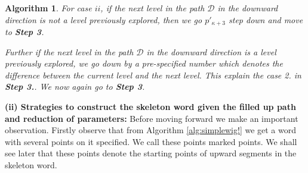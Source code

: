 \documentclass[12pt]{article}
\numberwithin{equation}{section}
\newtheorem{algorithm}{Algorithm}[section]
\numberwithin{equation}{section}
\theoremstyle{definition}
\renewcommand{\1}{\bf 1}
\begin{document}
\begin{algorithm}
\noindent 
For case $ii$, if the next level in the path $\mathcal{D}$ in the downward direction is not a level previously explored, then we go $p'_{\kappa+3}$ step down and move to \textbf{Step 3}. 

\noindent 
Further if the next level in the path $\mathcal{D}$ in the downward direction is a level previously explored, we go down by a pre-specified number which denotes the difference between the current level and the next level. This explain the case 2. in \textbf{Step 3.}. We now again go to \textbf{Step 3}.

%
%
%
%
\end{algorithm}

\noindent
\textbf{(ii) Strategies to construct the skeleton word given the filled up path and reduction of parameters:}
Before moving forward we make an important observation. Firstly observe that from Algorithm \ref{alg:simplewig!} we get a word with several points on it specified. We call these points marked points. We shall see later that these points denote the starting points of upward segments in the skeleton word. 
\end{document}

